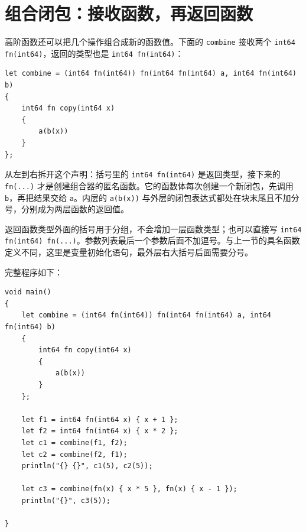 \section{组合闭包：接收函数，再返回函数}

高阶函数还可以把几个操作组合成新的函数值。下面的 \texttt{combine} 接收两个 \texttt{int64 fn(\allowbreak{}int64)\allowbreak{}}，返回的类型也是 \texttt{int64 fn(\allowbreak{}int64)\allowbreak{}}：

\par
\medskip
\begin{lstlisting}[style=chali]
let combine = (int64 fn(int64)) fn(int64 fn(int64) a, int64 fn(int64) b)
{
    int64 fn copy(int64 x)
    {
        a(b(x))
    }
};
\end{lstlisting}
\par
\medskip

从左到右拆开这个声明：括号里的 \texttt{int64 fn(\allowbreak{}int64)\allowbreak{}} 是返回类型，接下来的 \texttt{fn(\allowbreak{}.\allowbreak{}.\allowbreak{}.\allowbreak{})\allowbreak{}} 才是创建组合器的匿名函数。它的函数体每次创建一个新闭包，先调用 \texttt{b}，再把结果交给 \texttt{a}。内层的 \texttt{a(\allowbreak{}b(\allowbreak{}x)\allowbreak{})\allowbreak{}} 与外层的闭包表达式都处在块末尾且不加分号，分别成为两层函数的返回值。

返回函数类型外面的括号用于分组，不会增加一层函数类型；也可以直接写 \texttt{int64 fn(\allowbreak{}int64)\allowbreak{} fn(\allowbreak{}.\allowbreak{}.\allowbreak{}.\allowbreak{})\allowbreak{}}。参数列表最后一个参数后面不加逗号。与上一节的具名函数定义不同，这里是变量初始化语句，最外层右大括号后面需要分号。

完整程序如下：

\par
\medskip
\begin{lstlisting}[style=chali]
void main()
{
    let combine = (int64 fn(int64)) fn(int64 fn(int64) a, int64 fn(int64) b)
    {
        int64 fn copy(int64 x)
        {
            a(b(x))
        }
    };

    let f1 = int64 fn(int64 x) { x + 1 };
    let f2 = int64 fn(int64 x) { x * 2 };
    let c1 = combine(f1, f2);
    let c2 = combine(f2, f1);
    println("{} {}", c1(5), c2(5));

    let c3 = combine(fn(x) { x * 5 }, fn(x) { x - 1 });
    println("{}", c3(5));

}
\end{lstlisting}
\par
\medskip

